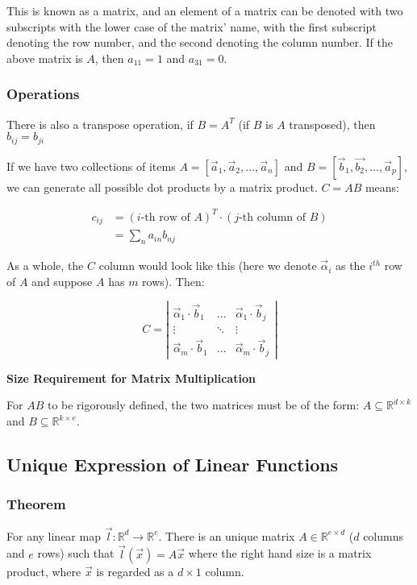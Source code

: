 \documentclass[11 pt, twoside]{article}
\begin{document}
This is known as a matrix, and an element of a matrix can be denoted with two
subscripts with the lower case of the matrix' name, with the first subscript denoting the row number, and the second denoting the
column number. If the above matrix is $A$, then $a_{11} = 1$ and $a_{31} = 0$.

\subsubsection{Operations}

There is also a transpose operation, if $B = A^T$ (if $B$ is $A$ transposed),
then $b_{ij} = b_{ji}$

If we have two collections of items $A = [\vec{a}_1, \vec{a}_2, \dots, \vec{a}_n]$
and $B = [\vec{b}_1, \vec{b_2}, \dots, \vec{a}_p]$, we can generate all possible
dot products by a matrix product. $C = AB$ means:

\begin{align*}
    c_{ij} &= (i\mbox{-th row of } A)^T \cdot (j\mbox{-th column of } B)\\
           &= \sum_n a_{in} b_{nj}
\end{align*}

As a whole, the $C$ column would look like this (here we denote $\vec{\alpha}_i$
as the $i^{th}$ row of $A$ and suppose $A$ has $m$ rows). Then:

\[
    C = \left|\begin{array}{ccc}
        \vec{\alpha}_1 \cdot \vec{b}_1 & \dots & \vec{\alpha}_1 \cdot
        \vec{b}_j\\
        \vdots & \ddots & \vdots\\
        \vec{\alpha}_m \cdot \vec{b}_1 & \dots & \vec{\alpha}_m \cdot
        \vec{b}_j
    \end{array}\right|
\]

\textbf{Size Requirement for Matrix Multiplication}

For $AB$ to be rigorously defined, the two matrices must be of the form: $A
\subseteq \mathbb{R}^{d\times k}$ and $B \subseteq \mathbb{R}^{k \times
e}$.


\subsection{Unique Expression of Linear Functions}
\subsubsection{Theorem}
For any linear map $\vec{l}: \mathbb{R}^d \to \mathbb{R}^e$.
There is an unique matrix $A \in \mathbb{R}^{e \times d}$ ($d$ columns and
$e$ rows) such that $\vec{l}(\vec{x}) = A\vec{x}$ where the right hand size is a
matrix product, where $\vec{x}$ is regarded as a $d \times 1$ column.
\end{document}
